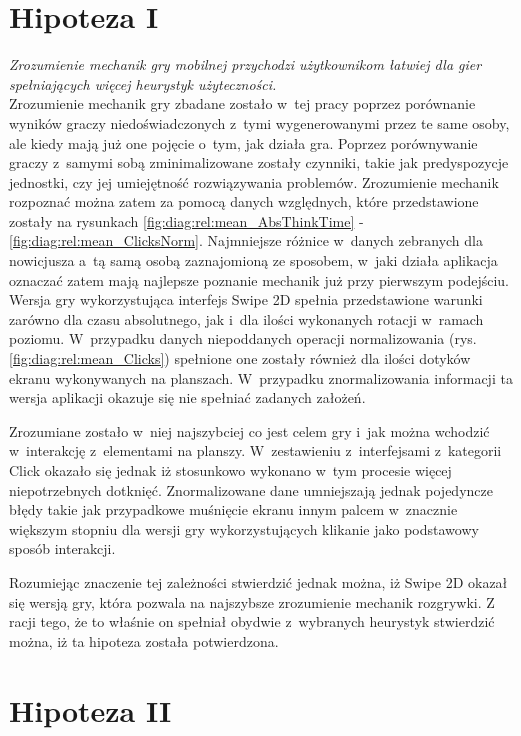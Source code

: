 \documentclass[a4paper,12pt,numbers=noenddot]{report}
\begin{document}
\section{Hipoteza I}
\textit{Zrozumienie mechanik gry mobilnej przychodzi użytkownikom łatwiej dla gier spełniających więcej heurystyk użyteczności.}\\

Zrozumienie mechanik gry zbadane zostało w~tej pracy poprzez porównanie wyników graczy niedoświadczonych z~tymi wygenerowanymi przez te same osoby, ale kiedy mają już one pojęcie o~tym, jak działa gra. Poprzez porównywanie graczy z~samymi sobą zminimalizowane zostały czynniki, takie jak predyspozycje jednostki, czy jej umiejętność rozwiązywania problemów. 
Zrozumienie mechanik rozpoznać można zatem za pomocą danych względnych, które przedstawione zostały na rysunkach \ref{fig:diag:rel:mean_AbsThinkTime} - \ref{fig:diag:rel:mean_ClicksNorm}. Najmniejsze różnice w~danych zebranych dla nowicjusza a~tą samą osobą zaznajomioną ze sposobem, w~jaki działa aplikacja oznaczać zatem mają najlepsze poznanie mechanik już przy pierwszym podejściu.\\

Wersja gry wykorzystująca interfejs Swipe 2D spełnia przedstawione warunki zarówno dla czasu absolutnego, jak i~dla ilości wykonanych rotacji w~ramach poziomu. W~przypadku danych niepoddanych operacji normalizowania (rys. \ref{fig:diag:rel:mean_Clicks}) spełnione one zostały również dla ilości dotyków ekranu wykonywanych na planszach. W~przypadku znormalizowania informacji ta wersja aplikacji okazuje się nie spełniać zadanych założeń.

Zrozumiane zostało w~niej najszybciej co jest celem gry i~jak można wchodzić w~interakcję z~elementami na planszy. W~zestawieniu z~interfejsami z~kategorii Click okazało się jednak iż stosunkowo wykonano w~tym procesie więcej niepotrzebnych dotknięć. Znormalizowane dane umniejszają jednak pojedyncze błędy takie jak przypadkowe muśnięcie ekranu innym palcem w~znacznie większym stopniu dla wersji gry wykorzystujących klikanie jako podstawowy sposób interakcji. 

Rozumiejąc znaczenie tej zależności stwierdzić jednak można, iż Swipe 2D okazał się wersją gry, która pozwala na najszybsze zrozumienie mechanik rozgrywki. Z racji tego, że to właśnie on spełniał obydwie z~wybranych heurystyk stwierdzić można, iż ta hipoteza została potwierdzona.

\section{Hipoteza II}
\end{document}
